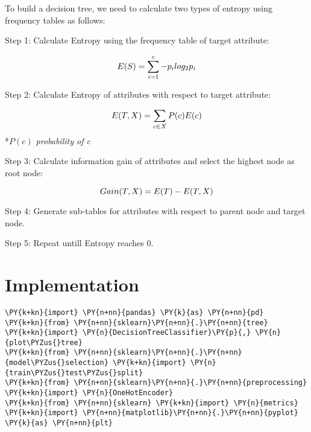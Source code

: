 To build a decision tree, we need to calculate two types of entropy
using frequency tables as follows:

Step 1: Calculate Entropy using the frequency table of target attribute:

\[
\Large E(S) = \sum_{i=1}^{c} -p_i log_2 p_i
\]

Step 2: Calculate Entropy of attributes with respect to target attribute:

\[
\Large E(T, X) = \sum_{c \in X} P(c)E(c)
\] *\emph{\(P(c)\) probability of c}

Step 3: Calculate information gain of attributes and select the highest
node as root node:

\[
\Large Gain(T, X) = E(T) - E(T, X)
\]

Step 4: Generate sub-tables for attributes with respect to parent node
and target node.

Step 5: Repeat untill Entropy reaches 0.

\section{Implementation}
    \begin{tcolorbox}[breakable, size=fbox, boxrule=1pt, pad at break*=1mm,colback=cellbackground, colframe=cellborder]
\begin{Verbatim}[commandchars=\\\{\}]
\PY{k+kn}{import} \PY{n+nn}{pandas} \PY{k}{as} \PY{n+nn}{pd}
\PY{k+kn}{from} \PY{n+nn}{sklearn}\PY{n+nn}{.}\PY{n+nn}{tree} \PY{k+kn}{import} \PY{n}{DecisionTreeClassifier}\PY{p}{,} \PY{n}{plot\PYZus{}tree}
\PY{k+kn}{from} \PY{n+nn}{sklearn}\PY{n+nn}{.}\PY{n+nn}{model\PYZus{}selection} \PY{k+kn}{import} \PY{n}{train\PYZus{}test\PYZus{}split}
\PY{k+kn}{from} \PY{n+nn}{sklearn}\PY{n+nn}{.}\PY{n+nn}{preprocessing} \PY{k+kn}{import} \PY{n}{OneHotEncoder}
\PY{k+kn}{from} \PY{n+nn}{sklearn} \PY{k+kn}{import} \PY{n}{metrics}
\PY{k+kn}{import} \PY{n+nn}{matplotlib}\PY{n+nn}{.}\PY{n+nn}{pyplot} \PY{k}{as} \PY{n+nn}{plt}
\end{Verbatim}
\end{tcolorbox}

